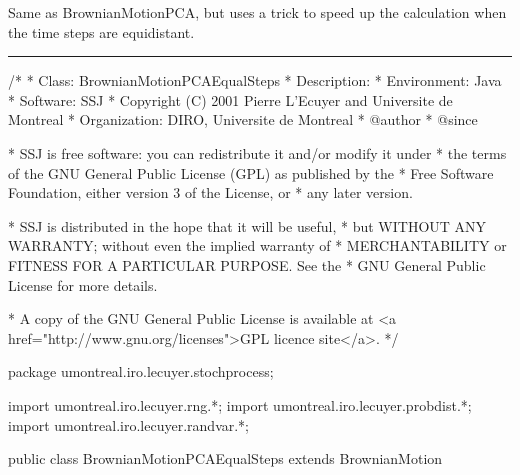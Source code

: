
Same as BrownianMotionPCA, but uses a trick to
speed up the calculation when the time steps
are equidistant.



\bigskip\hrule\bigskip

\begin{code}
\begin{hide}
/*
 * Class:        BrownianMotionPCAEqualSteps
 * Description:  
 * Environment:  Java
 * Software:     SSJ 
 * Copyright (C) 2001  Pierre L'Ecuyer and Universite de Montreal
 * Organization: DIRO, Universite de Montreal
 * @author       
 * @since

 * SSJ is free software: you can redistribute it and/or modify it under
 * the terms of the GNU General Public License (GPL) as published by the
 * Free Software Foundation, either version 3 of the License, or
 * any later version.

 * SSJ is distributed in the hope that it will be useful,
 * but WITHOUT ANY WARRANTY; without even the implied warranty of
 * MERCHANTABILITY or FITNESS FOR A PARTICULAR PURPOSE.  See the
 * GNU General Public License for more details.

 * A copy of the GNU General Public License is available at
   <a href="http://www.gnu.org/licenses">GPL licence site</a>.
 */
\end{hide}
package umontreal.iro.lecuyer.stochprocess;\begin{hide}
import umontreal.iro.lecuyer.rng.*;
import umontreal.iro.lecuyer.probdist.*;
import umontreal.iro.lecuyer.randvar.*;

\end{hide}

public class BrownianMotionPCAEqualSteps extends BrownianMotion \begin{hide} {

    double dt;
    protected double[][]  A;     // sigmaCov = AA' (PCA decomposition).
    protected double[]    z;     // vector of standard normals.
    protected boolean     isDecompPCA;
    protected double[]    sortedEigenvalues;



\end{hide}
\end{code}
